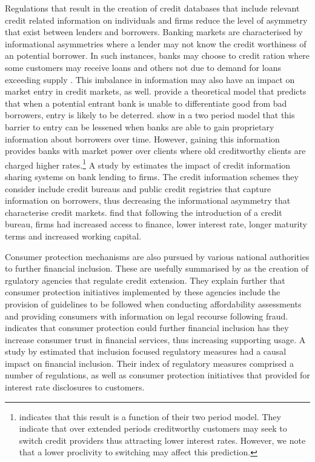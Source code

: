\documentclass[
  letterpaper,
  DIV=11,
  numbers=noendperiod]{scrartcl}
\begin{document}
Regulations that result in the creation of credit databases that include
relevant credit related information on individuals and firms reduce the
level of asymmetry that exist between lenders and borrowers. Banking
markets are characterised by informational asymmetries where a lender
may not know the credit worthiness of an potential borrower. In such
instances, banks may choose to credit ration where some customers may
receive loans and others not due to demand for loans exceeding supply
\citep{stiglitz1981}. This imbalance in information may also have an
impact on market entry in credit markets, as well. \citet{dell1999}
provide a theoretical model that predicts that when a potential entrant
bank is unable to differentiate good from bad borrowers, entry is likely
to be deterred. \citet{dell2001} show in a two period model that this
barrier to entry can be lessened when banks are able to gain proprietary
information about borrowers over time. However, gaining this information
provides banks with market power over clients where old creditworthy
clients are charged higher rates.\footnote{\citet{dell2001} indicates
  that this result is a function of their two period model. They
  indicate that over extended periods creditworthy customers may seek to
  switch credit providers thus attracting lower interest rates. However,
  we note that a lower proclivity to switching may affect this
  prediction.} A study by \citet{martinez2014} estimates the impact of
credit information sharing systems on bank lending to firms. The credit
information schemes they consider include credit bureaus and public
credit registries that capture information on borrowers, thus decreasing
the informational asymmetry that characterise credit markets.
\citet{martinez2014} find that following the introduction of a credit
bureau, firms had increased access to finance, lower interest rate,
longer maturity terms and increased working capital.

Consumer protection mechanisms are also pursued by various national
authorities to further financial inclusion. These are usefully
summarised by \citet{yoshino2016} as the creation of rgulatory agencies
that regulate credit extension. They explain further that consumer
protection initiatives implemented by these agencies include the
provision of guidelines to be followed when conducting affordability
assessments and providing consumers with information on legal recourse
following fraud. \citet{yoshino2016} indicates that consumer protection
could further financial inclusion has they increase consumer trust in
financial services, thus increasing supporting usage. A study by
\citet{chen2019} estimated that inclusion focused regulatory measures
had a causal impact on financial inclusion. Their index of regulatory
measures comprised a number of regulations, as well as consumer
protection initiatives that provided for interest rate disclosures to
customers.
\end{document}
